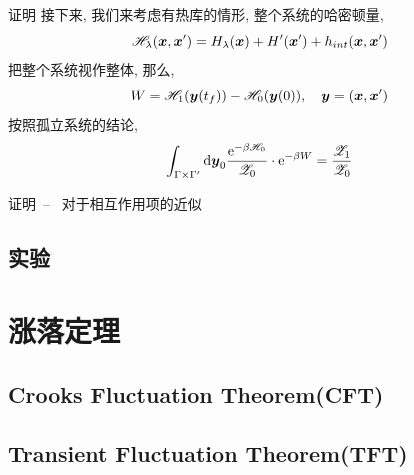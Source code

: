 \documentclass[aspectratio=169]{wzbeamer}
\begin{document}
    \begin{frame}{证明}
        接下来, 我们来考虑有热库的情形, 整个系统的哈密顿量,
        \begin{equation}
            \mathscr{H}_\lambda(\vb*x,\vb*x') = H_\lambda(\vb*x) + H'(\vb*x') + h_{int} (\vb*x, \vb*x')
        \end{equation}
        把整个系统视作整体, 那么,
        \begin{equation}
            W = \mathscr H_1(\vb*y(t_f)) - \mathscr H_0(\vb*y(0)),\quad \vb*y = (\vb*x, \vb*x')
        \end{equation}
        按照孤立系统的结论,
        \begin{equation}
            \int_{\Gamma\times\Gamma'}\dd\vb*y_0 \frac{\mathrm{e}^{-\beta\mathscr H_0}}{\mathscr Z_0} \cdot \mathrm{e}^{-\beta W} = \frac{\mathscr Z_1}{\mathscr Z_0}
        \end{equation}
    \end{frame}
    \begin{frame}{证明\ -- \ 对于相互作用项的近似}
        
    \end{frame}
    \subsection{实验}

\section{涨落定理}
    \subsection{Crooks Fluctuation Theorem(CFT)}
    \subsection{Transient Fluctuation Theorem(TFT)}


\end{document}
